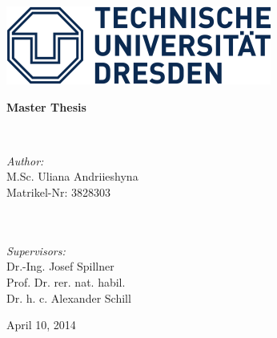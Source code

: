 \begin{titlepage}

\begin{center}

\begin{minipage}{0.30\textwidth}
	\begin{flushleft}
			\includegraphics[scale=0.45]{images/tud_logo}
	\end{flushleft}
\end{minipage}

\begin{bfseries}
	\Large 
\end{bfseries}

\vspace*{75mm}

{\LARGE \bf Master Thesis}\\[1 cm]

\begin{minipage}{0.8\textwidth}
	\begin{center}

		\\[3cm]
	\end{center}
\end{minipage}

\vspace{30mm}

\begin{minipage}{0.35\textwidth}
	\begin{flushleft} \large
		\emph{Author:}\\
		M.Sc. Uliana Andriieshyna\\
		Matrikel-Nr: 3828303\\
		~\\ ~\\
	\end{flushleft}
\end{minipage}
\begin{minipage}{0.60\textwidth}
	\begin{flushright} \large
		\emph{Supervisors:} \\
		Dr.-Ing. Josef Spillner\\
		Prof. Dr. rer. nat. habil.\\ Dr. h. c. Alexander Schill\\
		\end{flushright}
\end{minipage}

\vfill

April 10, 2014

\end{center}
\end{titlepage}